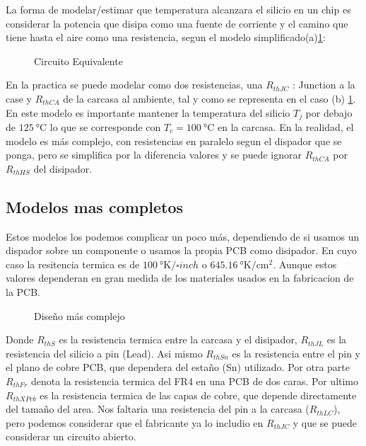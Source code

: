 
La forma de modelar/estimar que temperatura alcanzara el silicio en un chip es considerar
la potencia que disipa como una fuente de corriente y el camino que tiene hasta el aire como
una resistencia, segun el modelo simplificado(a)\ref{fig:ThermalEquivalent}:

\begin{figure}[H]
    \centering
    
    \caption{Circuito Equivalente}
    \label{fig:ThermalEquivalent}
\end{figure}

En la practica se puede modelar como dos resistencias, una $R_{thJC}$ :
Junction a la case y $R_{thCA}$ de la 
carcasa al ambiente, tal y como se representa en el caso (b) \ref{fig:ThermalEquivalent}.
En este modelo es importante mantener la temperatura del silicio $T_j$ por debajo de
$\SI{125}{\celsius}$ lo que se corresponde con $T_c=\SI{100}{\celsius}$ en la carcasa.
En la realidad, el modelo es más complejo, con resistencias en paralelo segun el dispador
que se ponga, pero se simplifica por la diferencia valores y se puede ignorar $R_{thCA}$
por $R_{thHS}$ del disipador.
\subsection{Modelos mas completos}
Estos modelos los podemos complicar un poco más, dependiendo de si usamos un dispador sobre un componente o 
usamos la propia PCB como disipador. En cuyo caso la resitencia termica es
de $\SI{100}{\degree\kelvin/\square{inch}}$ o $\SI{645.16}{\degree\kelvin/\square\cm}$.
Aunque estos valores dependeran en gran medida de los materiales usados en la 
fabricacion de la PCB.


\begin{figure}[H]
    \centering
    
    \caption{Diseño más complejo}
    \label{fig:ThermalEquivFull}
\end{figure}

Donde $R_{thS}$ es la resistencia termica entre la carcasa y el disipador, $R_{thJL}$ es la
resistencia del silicio a pin (Lead). Asi mismo $R_{thSn}$ es la resistencia entre el pin
y el plano de cobre PCB, que dependera del estaño (Sn) utilizado. Por otra parte $R_{thFr}$
denota la resistencia termica del FR4 en una PCB de dos caras. Por ultimo $R_{thXPcb}$ es la
resistencia termica de las capas de cobre, que depende directamente del tamaño del area.
Nos faltaria una resistencia del pin a la carcasa ($R_{thLC}$), pero podemos considerar que el fabricante ya lo includio en $R_{thJC}$ y que se puede considerar un circuito abierto.


